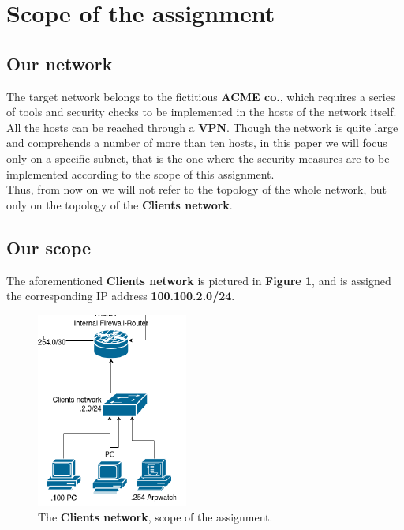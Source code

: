 \section{Scope of the assignment}
\subsection{Our network}
The target network belongs to the fictitious \textbf{ACME co.}, which requires a series of tools and security checks to be implemented in the hosts of the network itself.\\
All the hosts can be reached through a \textbf{VPN}. Though the network is quite large and comprehends a number of more than ten hosts, in this paper we will focus only on a specific subnet, that is the one where the security measures are to be implemented according to the scope of this assignment.\\
Thus, from now on we will not refer to the topology of the whole network, but only on the topology of the \textbf{Clients network}.

\subsection{Our scope}
The aforementioned \textbf{Clients network} is pictured in \textbf{Figure 1}, and is assigned the corresponding IP address \textbf{100.100.2.0/24}.\\

\begin{figure}[htpb]
\centering
\includegraphics[width=\textwidth]{clientsNetwork.png}
\caption[a]{The \textbf{Clients network}, scope of the assignment.}\label{fig:1}
\end{figure}

